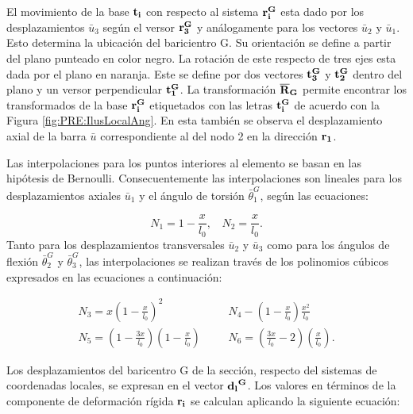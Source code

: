 El movimiento de la base $\bf{t_i}$ con respecto al sistema $\bf{r_i^G}$ esta dado por los desplazamientos  $\bar{u}_3$ según el versor  $\bf{r_3^G}$ y análogamente para los vectores $\bar{u}_2$ y $\bar{u}_1$. Esto determina la ubicación del baricientro G. Su orientación se define a partir del plano punteado en color negro. La rotación de este respecto de tres ejes esta dada por el plano en naranja. Este se define por dos vectores $\bf{t_3^G}$ y $\bf{t_2^G}$ dentro del plano y un versor perpendicular $\bf{t_1^G}$. La transformación $\bf{\overline{R}}_G$ permite encontrar  los transformados de la base $\bf{r_i^G}$ etiquetados con las letras $\bf{t_i^G}$ de acuerdo con la Figura \ref{fig:PRE:IlusLocalAng}. En esta también se observa el desplazamiento axial de la barra $\bar{u}$ correspondiente al del nodo 2 en la dirección $\bf{r_1}$.

Las interpolaciones para los puntos interiores al elemento se basan en las hipótesis de Bernoulli. Consecuentemente las interpolaciones son lineales para los desplazamientos axiales $\bar{u}_1$ y el ángulo de torsión $\bar{\theta}_1^G$, según las ecuaciones:

\begin{equation}
    \label{Eqn:PRE:FuncInterpol1}
	N_1 = 1 - \frac{x}{l_0},   		~~~~ 	N_2= \frac{x}{l_0}.
\end{equation}
Tanto para los desplazamientos transversales $\bar{u}_2$ y $\bar{u}_3$  como para los ángulos de flexión $\bar{\theta}_2^G$ y $\bar{\theta}_3^G$, las interpolaciones se realizan través de los polinomios cúbicos expresados en las ecuaciones a continuación:

\begin{eqnarray}
 		\label{Eqn:PRE:FuncInterpol2}
 		N_3 = x\left(1 - \frac{x}{l_0}\right)^2 	&~~~~&  N_4 - \left( 1 - \frac{x}{l_0} \right ) \frac{x^2}{l_0} \\
 		\label{Eqn:PRE:FuncInterpol3}
 		N_5 = \left(1 - \frac{3x}{l_0}\right) \left(1 - \frac{x}{l_0}\right) 	&~~~~&  N_6 =\left( \frac{3x}{l_0}-2\right) \left(\frac{x}{l_0}\right).
\end{eqnarray}

Los desplazamientos del baricentro G de la sección, respecto del sistemas de coordenadas locales, se expresan en el vector $\bf{d_l}^G$. Los valores en términos de la componente de deformación rígida $\bf{r_i}$ se calculan aplicando la siguiente ecuación:

